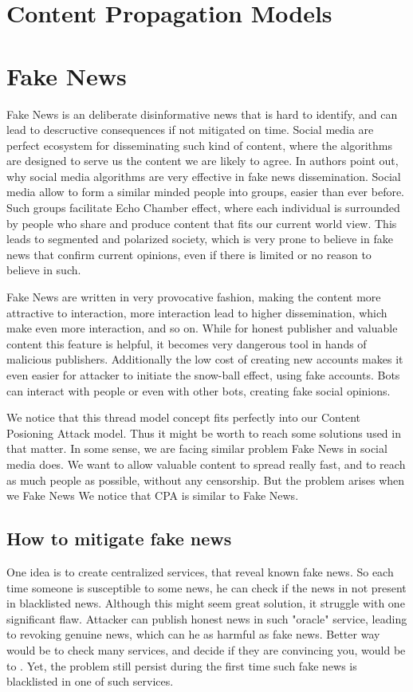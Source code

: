 \documentclass[nostrict]{szablonPG}
\begin{document}
\section{Content Propagation Models}

\section{Fake News}
Fake News is an deliberate disinformative news that is hard to identify, and can lead to descructive consequences if not mitigated on time. Social media are perfect ecosystem for disseminating such kind of content, where the algorithms are designed to serve us the content we are likely to agree. In \cite{zhou2018fake} authors point out, why social media algorithms are very effective in fake news dissemination. Social media allow to form a similar minded people into groups, easier than ever before. Such groups facilitate Echo Chamber effect, where each individual is surrounded by people who share and produce content that fits our current world view. This leads to segmented and polarized society, which is very prone to believe in fake news that confirm current opinions, even if there is limited or no reason to believe in such. 


Fake News are written in very provocative fashion, making the content more attractive to interaction, more interaction lead to higher dissemination, which make even more interaction, and so on. While for honest publisher and valuable content this feature is helpful, it becomes very dangerous tool in hands of malicious publishers. Additionally the low cost of creating new accounts makes it even easier for attacker to initiate the snow-ball effect, using fake accounts. Bots can interact with people or even with other bots, creating fake social opinions.  

We notice that this thread model concept fits perfectly into our Content Posioning Attack model. Thus it might be worth to reach some solutions used in that matter. 
In some sense, we are facing similar problem Fake News in social media does. We want to allow valuable content to spread really fast, and to reach as much people as possible, without any censorship. But the problem arises when we 
Fake News 
We notice that CPA is similar to Fake News. 

\subsection{How to mitigate fake news}
One idea is to create centralized services, that reveal known fake news. So each time someone is susceptible to some news, he can check if the news in not present in blacklisted news. Although this might seem great solution, it struggle with one significant flaw. Attacker can publish honest news in such "oracle" service, leading to revoking genuine news, which can he as harmful as fake news. Better way would be to check many services, and decide if they are convincing you, would be to  . 
Yet, the problem still persist during the first time such fake news is blacklisted in one of such services. 
\end{document}
